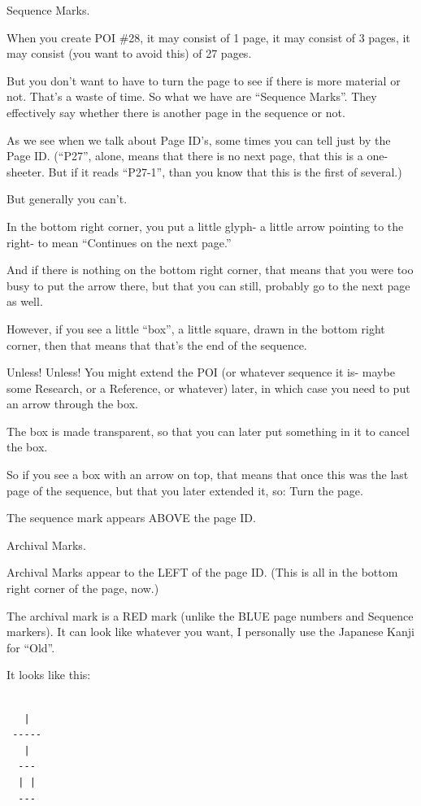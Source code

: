 \documentclass[oneside]{book}
\begin{document}
Sequence Marks.

When you create POI \#28, it may consist of 1 page, it may consist of 3
pages, it may consist (you want to avoid this) of 27 pages.

But you don't want to have to turn the page to see if there is more
material or not. That's a waste of time. So what we have are ``Sequence
Marks''. They effectively say whether there is another page in the
sequence or not.

As we see when we talk about Page ID's, some times you can tell just
by the Page ID. (``P27'', alone, means that there is no next page, that
this is a one-sheeter. But if it reads ``P27-1'', than you know that
this is the first of several.)

But generally you can't.

In the bottom right corner, you put a little glyph- a little arrow
pointing to the right- to mean ``Continues on the next page.''

And if there is nothing on the bottom right corner, that means that
you were too busy to put the arrow there, but that you can still,
probably go to the next page as well.

However, if you see a little ``box'', a little square, drawn in the
bottom right corner, then that means that that's the end of the
sequence.

Unless! Unless! You might extend the POI (or whatever sequence it is-
maybe some Research, or a Reference, or whatever) later, in which case
you need to put an arrow through the box.

The box is made transparent, so that you can later put something in it
to cancel the box.

So if you see a box with an arrow on top, that means that once this
was the last page of the sequence, but that you later extended it, so:
Turn the page.

The sequence mark appears ABOVE the page ID.

Archival Marks.

Archival Marks appear to the LEFT of the page ID. (This is all in the
bottom right corner of the page, now.)

The archival mark is a RED mark (unlike the BLUE page numbers and
Sequence markers). It can look like whatever you want, I personally
use the Japanese Kanji for ``Old''.

It looks like this:
\begin{verbatim}

   |
 -----
   |
  ---
  | |
  ---
\end{verbatim}
\end{document}

